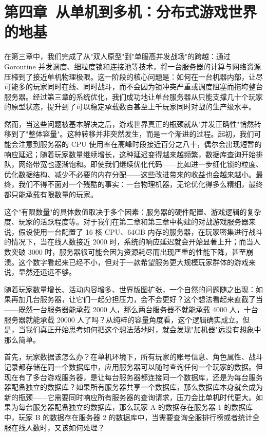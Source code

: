\section{第四章\ 从单机到多机：分布式游戏世界的地基}\label{sec:chapter4}

在第三章中，我们完成了从"双人原型"到"单服高并发战场"的跨越：通过 Goroutine 并发调度、细粒度锁和连接池等技术，将一台服务器的计算与网络资源压榨到了接近单机物理极限。这一阶段的核心问题是：如何在一台机器内部，让尽可能多的玩家同时在线、同时战斗，而不会因为锁冲突严重或调度阻塞而拖垮整台服务器。经过第三章的系统优化，我们成功地让单台服务器从只能支撑几十个玩家的原型状态，提升到了可以稳定承载数百甚至上千玩家同时对战的生产级水平。

然而，当这些问题被基本解决之后，游戏世界真正的瓶颈就从"并发正确性"悄然转移到了"整体容量"。这种转移并非突然发生，而是一个渐进的过程。起初，我们可能会注意到服务器的 CPU 使用率在高峰时段接近百分之八十，偶尔会出现短暂的响应延迟；随着玩家数量继续增长，这种延迟变得越来越频繁，数据库查询开始排队，网络带宽也逐渐饱和。即使我们继续优化代码——比如进一步细化锁的粒度、优化数据结构、减少不必要的内存分配——这些改进带来的收益也会越来越小。最终，我们不得不面对一个残酷的事实：一台物理机器，无论优化得多么精细，最终都只能承载有限数量的玩家。

这个"有限数量"的具体数值取决于多个因素：服务器的硬件配置、游戏逻辑的复杂度、玩家的活跃程度等。对于我们在第二章和第三章中构建的对战游戏服务器来说，假设使用一台配置了 16 核 CPU、64GB 内存的服务器，在玩家密集进行战斗的情况下，当在线人数接近 2000 时，系统的响应延迟就会开始显著上升；而当人数突破 3000 时，服务器很可能会因为资源耗尽而出现严重的性能下降，甚至崩溃。这个数字看起来已经不小，但对于一款希望服务更大规模玩家群体的游戏来说，显然还远远不够。


随着玩家数量增长、活动内容增多、世界版图扩张，一个自然的问题随之出现：如果再加几台服务器，让它们一起分担压力，会不会更好？这个想法看起来直截了当——既然一台服务器能承载 2000 人，那么两台服务器不就能承载 4000 人，十台服务器就能承载 20000 人了吗？从纯粹的容量角度看，这个逻辑确实成立。但是，当我们真正开始思考如何把这个想法落地时，就会发现"加机器"远没有想象中那么简单。

首先，玩家数据该怎么办？在单机环境下，所有玩家的账号信息、角色属性、战斗记录都存储在同一个数据库中，应用服务器可以随时查询任何一个玩家的数据。但现在有了多台游戏服务器，是让每台服务器都连接同一个数据库，还是为每台服务器配备独立的数据库？如果所有服务器共享一个数据库，那么数据库本身就会成为新的瓶颈——它需要同时响应所有服务器的查询请求，压力会比单机时代更大。如果为每台服务器配备独立的数据库，那么玩家 A 的数据存在服务器 1 的数据库中，玩家 B 的数据存在服务器 2 的数据库中，当需要查询全服排行榜或者统计全服在线人数时，又该如何处理？

